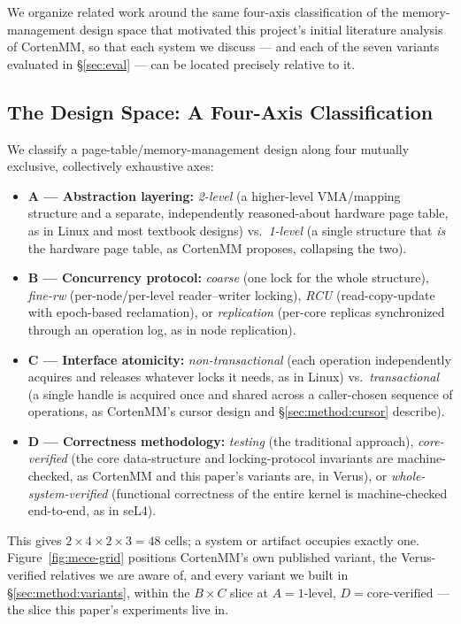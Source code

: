 \documentclass[10pt]{article}
\begin{document}
We organize related work around the same four-axis classification of
the memory-management design space that motivated this project's
initial literature analysis of CortenMM, so that each system we
discuss --- and each of the seven variants evaluated in
\S\ref{sec:eval} --- can be located precisely relative to it.

\subsection{The Design Space: A Four-Axis Classification}
\label{sec:related:mece}

We classify a page-table/memory-management design along four
mutually exclusive, collectively exhaustive axes:

\begin{itemize}
  \item \textbf{A --- Abstraction layering:} \emph{2-level} (a
    higher-level VMA/mapping structure and a separate, independently
    reasoned-about hardware page table, as in Linux and most
    textbook designs) vs.\ \emph{1-level} (a single structure that
    \emph{is} the hardware page table, as CortenMM proposes, collapsing
    the two).
  \item \textbf{B --- Concurrency protocol:} \emph{coarse} (one lock for
    the whole structure), \emph{fine-rw} (per-node/per-level
    reader--writer locking), \emph{RCU} (read-copy-update with
    epoch-based reclamation), or \emph{replication} (per-core replicas
    synchronized through an operation log, as in node replication).
  \item \textbf{C --- Interface atomicity:} \emph{non-transactional}
    (each operation independently acquires and releases whatever
    locks it needs, as in Linux) vs.\ \emph{transactional} (a single
    handle is acquired once and shared across a caller-chosen sequence
    of operations, as CortenMM's cursor design and
    \S\ref{sec:method:cursor} describe).
  \item \textbf{D --- Correctness methodology:} \emph{testing} (the
    traditional approach), \emph{core-verified} (the core
    data-structure and locking-protocol invariants are
    machine-checked, as CortenMM and this paper's variants are, in
    Verus), or \emph{whole-system-verified} (functional correctness of
    the entire kernel is machine-checked end-to-end, as in seL4).
\end{itemize}

This gives $2 \times 4 \times 2 \times 3 = 48$ cells; a system or
artifact occupies exactly one. Figure~\ref{fig:mece-grid} positions
CortenMM's own published variant, the Verus-verified relatives we are
aware of, and every variant we built in \S\ref{sec:method:variants},
within the $B \times C$ slice at $A{=}1\text{-level}$,
$D{=}\text{core-verified}$ --- the slice this paper's experiments live
in.
\end{document}

